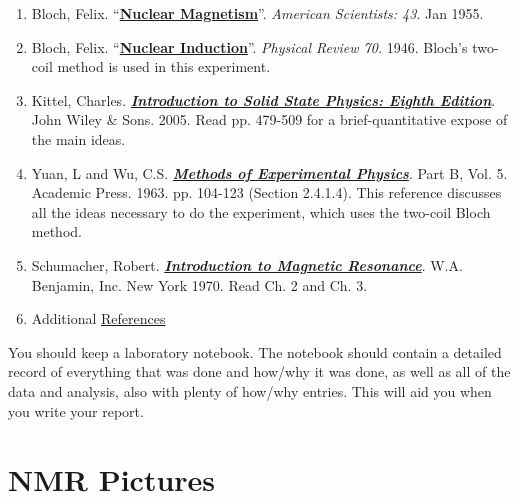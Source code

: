 \documentclass{../lab}
\begin{document}
\begin{enumerate}
    \item Bloch, Felix. ``\href{https://berkeley-physics111b.github.io/assets/pdf/oldwebsitestructure/NMR/References/02-Nuclear_Magnetism.pdf}{\textbf{Nuclear Magnetism}}''. \emph{American Scientists: 43}. Jan 1955.

    \item Bloch, Felix. ``\href{https://berkeley-physics111b.github.io/assets/pdf/oldwebsitestructure/NMR/References/03-Nuclear_Induction.pdf}{\textbf{Nuclear Induction}}''. \emph{Physical Review 70.} 1946. Bloch's two-coil method is used in this experiment.

    \item Kittel, Charles. \href{https://berkeley-physics111b.github.io/assets/pdf/oldwebsitestructure/Books/Kittel_Introduction\%20to\%20Solid\%20State\%20Physics-Eighth\%20Edition.pdf}{\textbf{\emph{Introduction to Solid State Physics: Eighth Edition}}}. John Wiley \& Sons. 2005. Read pp. 479-509 for a brief-quantitative expose of the main ideas.

    \item Yuan, L and Wu, C.S. \href{https://berkeley-physics111b.github.io/assets/pdf/oldwebsitestructure/NMR/References/01-Methods_of_Experimental_Physics.pdf}{\textbf{\emph{Methods of Experimental Physics}}}. Part B, Vol. 5. Academic Press. 1963. pp. 104-123 (Section 2.4.1.4). This reference discusses all the ideas necessary to do the experiment, which uses the two-coil Bloch method.

   \item Schumacher, Robert.    \href{https://berkeley-physics111b.github.io/assets/pdf/oldwebsitestructure/Books/Schumacher_Introduction%20to%20Magnetic%20Resonance.pdf}{\textbf{\emph{Introduction to Magnetic Resonance}}}. W.A. Benjamin, Inc. New York 1970. Read Ch. 2 and Ch. 3.
   
   \item Additional
   \hyperref[References]{ References}
\end{enumerate}

You should keep a laboratory notebook. The notebook should contain a detailed record of everything that was done and how/why it was done, as well as all of the data and analysis, also with plenty of how/why entries. This will aid you when you write your report.

\section{NMR Pictures}
\end{document}
